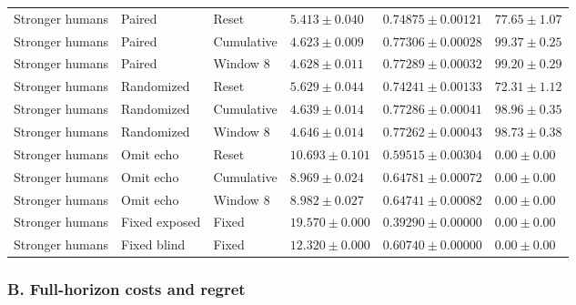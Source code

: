 \begin{longtable}{@{}llllll@{}}
Stronger humans & Paired & Reset & $5.413 \pm 0.040$ & $0.74875 \pm 0.00121$ & $77.65 \pm 1.07$ \\
Stronger humans & Paired & Cumulative & $4.623 \pm 0.009$ & $0.77306 \pm 0.00028$ & $99.37 \pm 0.25$ \\
Stronger humans & Paired & Window 8 & $4.628 \pm 0.011$ & $0.77289 \pm 0.00032$ & $99.20 \pm 0.29$ \\
Stronger humans & Randomized & Reset & $5.629 \pm 0.044$ & $0.74241 \pm 0.00133$ & $72.31 \pm 1.12$ \\
Stronger humans & Randomized & Cumulative & $4.639 \pm 0.014$ & $0.77286 \pm 0.00041$ & $98.96 \pm 0.35$ \\
Stronger humans & Randomized & Window 8 & $4.646 \pm 0.014$ & $0.77262 \pm 0.00043$ & $98.73 \pm 0.38$ \\
Stronger humans & Omit echo & Reset & $10.693 \pm 0.101$ & $0.59515 \pm 0.00304$ & $0.00 \pm 0.00$ \\
Stronger humans & Omit echo & Cumulative & $8.969 \pm 0.024$ & $0.64781 \pm 0.00072$ & $0.00 \pm 0.00$ \\
Stronger humans & Omit echo & Window 8 & $8.982 \pm 0.027$ & $0.64741 \pm 0.00082$ & $0.00 \pm 0.00$ \\
Stronger humans & Fixed exposed & Fixed & $19.570 \pm 0.000$ & $0.39290 \pm 0.00000$ & $0.00 \pm 0.00$ \\
Stronger humans & Fixed blind & Fixed & $12.320 \pm 0.000$ & $0.60740 \pm 0.00000$ & $0.00 \pm 0.00$ \\
\end{longtable}\endgroup
\subsubsection*{B. Full-horizon costs and regret}
\begingroup\footnotesize\setlength{\tabcolsep}{4pt}

